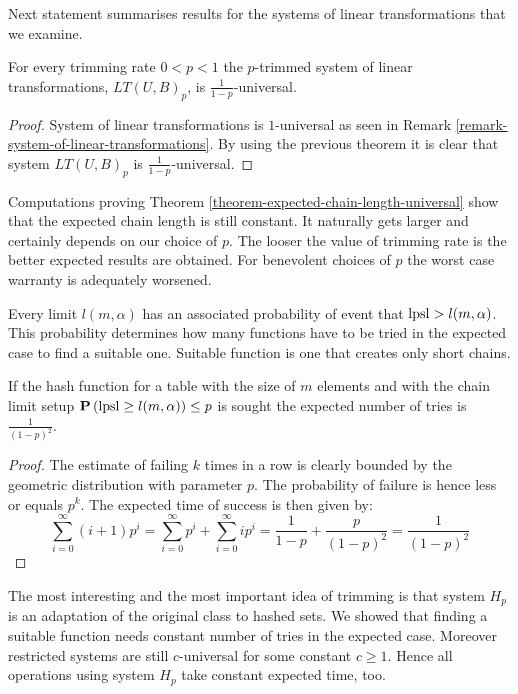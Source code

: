 Next statement summarises results for the systems of linear transformations that we examine.

\begin{corollary}
\label{corollary-trimming-linear}
For every trimming rate $0 < p < 1$ the $p$-trimmed system of linear transformations, $LT(U, B)_p$, is $\frac{1}{1 - p}$-universal.
\end{corollary}
\begin{proof}
System of linear transformations is $1$-universal as seen in Remark \ref{remark-system-of-linear-transformations}. By using the previous theorem it is clear that system $LT(U, B)_p$ is $\frac{1}{1 - p}$-universal.
\end{proof}

Computations proving Theorem \ref{theorem-expected-chain-length-universal} show that the expected chain length is still constant. It naturally gets larger and certainly depends on our choice of $p$. The looser the value of trimming rate is the better expected results are obtained. For benevolent choices of $p$ the worst case warranty is adequately worsened.

Every limit $l(m, \alpha)$ has an associated probability of event that $\mathrm{lpsl} > l(m, \alpha)$. This probability determines how many functions have to be tried in the expected case to find a suitable one. Suitable function is one that creates only short chains.

\begin{lemma}
\label{lemma-linear-transformations-tries}
If the hash function for a table with the size of $m$ elements and with the chain limit setup $\mathbf{P}\left(\mathrm{lpsl} \geq l(m, \alpha)\right) \leq p$ is sought the expected number of tries is $\frac{1}{(1 - p)^2}$.
\end{lemma}
\begin{proof}
The estimate of failing $k$ times in a row is clearly bounded by the geometric distribution with parameter $p$. The probability of failure is hence less or equals $p^k$. The expected time of success is then given by:
\[
\sum_{i = 0}^{\infty} (i + 1)p^i = \sum_{i = 0}^{\infty}p^i + \sum_{i = 0}^{\infty}ip^i = \frac{1}{1 - p} + \frac{p}{(1- p)^2} = \frac{1}{(1 - p)^2}
\]
\end{proof}

The most interesting and the most important idea of trimming is that system $H_p$ is an adaptation of the original class to hashed sets. We showed that finding a suitable function needs constant number of tries in the expected case. Moreover restricted systems are still $c$-universal for some constant $c \geq 1$. Hence all operations using system $H_p$ take constant expected time, too.

